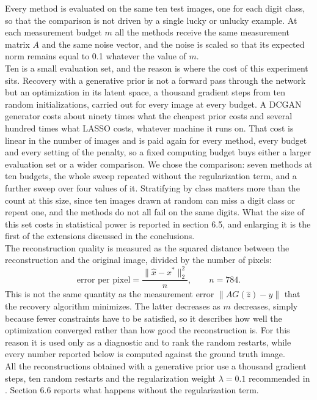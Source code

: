 Every method is evaluated on the same ten test images, one for each digit class, so that the comparison is not driven by a single lucky or unlucky example. At each measurement budget \( m \) all the methods receive the same measurement matrix \( A \) and the same noise vector, and the noise is scaled so that its expected norm remains equal to 0.1 whatever the value of \( m \).
\\
Ten is a small evaluation set, and the reason is where the cost of this experiment sits. Recovery with a generative prior is not a forward pass through the network but an optimization in its latent space, a thousand gradient steps from ten random initializations, carried out for every image at every budget. A DCGAN generator costs about ninety times what the cheapest prior costs and several hundred times what LASSO costs, whatever machine it runs on. That cost is linear in the number of images and is paid again for every method, every budget and every setting of the penalty, so a fixed computing budget buys either a larger evaluation set or a wider comparison. We chose the comparison: seven methods at ten budgets, the whole sweep repeated without the regularization term, and a further sweep over four values of it. Stratifying by class matters more than the count at this size, since ten images drawn at random can miss a digit class or repeat one, and the methods do not all fail on the same digits. What the size of this set costs in statistical power is reported in section 6.5, and enlarging it is the first of the extensions discussed in the conclusions.
\\
The reconstruction quality is measured as the squared distance between the reconstruction and the original image, divided by the number of pixels:
\begin{equation}
\text{error per pixel} = \frac{\lVert \hat{x} - x^* \rVert_2^2}{n}, \qquad n = 784 .
\end{equation}
This is not the same quantity as the measurement error \( \lVert AG(\hat{z}) - y \rVert \) that the recovery algorithm minimizes. The latter decreases as \( m \) decreases, simply because fewer constraints have to be satisfied, so it describes how well the optimization converged rather than how good the reconstruction is. For this reason it is used only as a diagnostic and to rank the random restarts, while every number reported below is computed against the ground truth image.
\\
All the reconstructions obtained with a generative prior use a thousand gradient steps, ten random restarts and the regularization weight \( \lambda = 0.1 \) recommended in \cite{bora2017}. Section 6.6 reports what happens without the regularization term.

